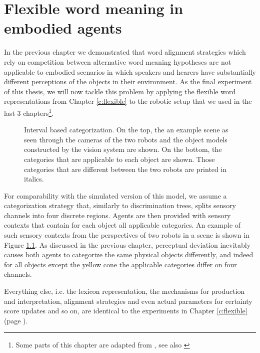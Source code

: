 
\setcounter{chapter}{9}

\chapter{Flexible word meaning in embodied agents}
\label{c:flexible-grounded}
\label{c:gfwm}

In the previous chapter we demonstrated that word alignment strategies
which rely on competition between alternative word meaning hypotheses
are not applicable to embodied scenarios in which speakers and hearers
have substantially different perceptions of the objects in their
environment. As the final experiment of this thesis, we will now
tackle this problem by applying the flexible word representations from
Chapter \ref{c:flexible} to the robotic setup that we used in the last
3 chapters\footnote{Some parts of this chapter are adapted from
  \cite*{wellens08flexible}, see also
  \cite{wellens07flexible,wellens12multi-dimensional}}.


\begin{figure}[ht!] 
  
  \caption{Interval based categorization. On the top, the an example
    scene as seen through the cameras of the two robots and the object
    models constructed by the vision system are shown. On the bottom,
    the categories that are applicable to each object are shown. Those
    categories that are different between the two robots are printed
    in italics.}
  \label{f:gfwm-scene}
\end{figure}

For comparability with the simulated version of this model, we assume
a categorization strategy that, similarly to discrimination trees,
splits sensory channels into four discrete regions. Agents are then
provided with sensory contexts that contain for each object all
applicable categories. An example of such sensory contexts from the
perspectives of two robots in a scene is shown in Figure
\ref{f:gfwm-scene}. As discussed in the previous chapter, perceptual
deviation inevitably causes both agents to categorize the same
physical objects differently, and indeed for all objects except the
yellow cone the applicable categories differ on four channels.


Everything else, i.e. the lexicon representation, the mechanisms for
production and interpretation, alignment strategies and even actual
parameters for certainty score updates and so on, are identical to the
experiments in Chapter \ref{c:flexible} (page \pageref{c:flexible}).


